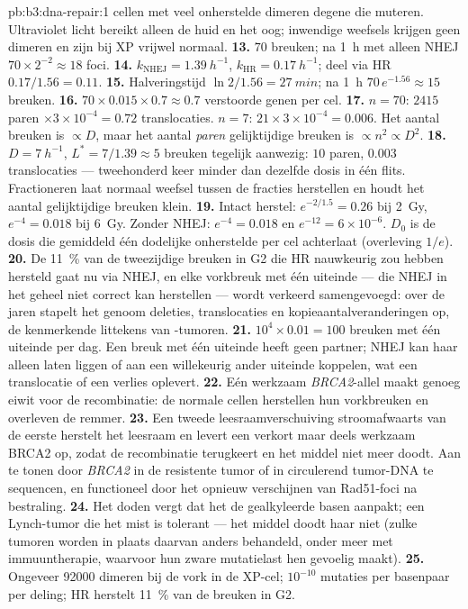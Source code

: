 \begin{solution}{pb:b3:dna-repair:1}
cellen met veel onherstelde dimeren degene die muteren. Ultraviolet
licht bereikt alleen de huid en het oog; inwendige weefsels krijgen
geen dimeren en zijn bij XP vrijwel normaal.
\textbf{13.} $70$ breuken; na \qty{1}{h} met alleen NHEJ $70\times
2^{-2} \approx 18$ foci.
\textbf{14.} $k_{\text{NHEJ}} = \qty{1.39}{h^{-1}}$, $k_{\text{HR}} =
\qty{0.17}{h^{-1}}$; deel via HR $0.17/1.56 = 0.11$.
\textbf{15.} Halveringstijd $\ln 2/1.56 = \qty{27}{min}$; na \qty{1}{h}
$70\,e^{-1.56} \approx 15$ breuken.
\textbf{16.} $70\times 0.015\times 0.7 \approx 0.7$ verstoorde genen per
cel.
\textbf{17.} $n = 70$: $2415$ paren $\times 3\times 10^{-4} = 0.72$
translocaties. $n = 7$: $21\times 3\times 10^{-4} = 0.006$. Het aantal
breuken is $\propto D$, maar het aantal \emph{paren} gelijktijdige
breuken is $\propto n^{2} \propto D^{2}$.
\textbf{18.} $D = \qty{7}{h^{-1}}$, $L^{*} = 7/1.39 \approx 5$ breuken
tegelijk aanwezig: $10$ paren, $0.003$ translocaties --- tweehonderd
keer minder dan dezelfde dosis in één flits. Fractioneren laat normaal
weefsel tussen de fracties herstellen en houdt het aantal gelijktijdige
breuken klein.
\textbf{19.} Intact herstel: $e^{-2/1.5} = 0.26$ bij \qty{2}{Gy},
$e^{-4} = 0.018$ bij \qty{6}{Gy}. Zonder NHEJ: $e^{-4} = 0.018$ en
$e^{-12} = 6\times 10^{-6}$. $D_{0}$ is de dosis die gemiddeld één
dodelijke onherstelde  per cel achterlaat (overleving $1/e$).
\textbf{20.} De \qty{11}{\%} van de tweezijdige breuken in G2 die HR
nauwkeurig zou hebben hersteld gaat nu via NHEJ, en elke vorkbreuk met
één uiteinde --- die NHEJ in het geheel niet correct kan herstellen ---
wordt verkeerd samengevoegd: over de jaren stapelt het genoom deleties,
translocaties en kopieaantalveranderingen op, de kenmerkende littekens
van \emph{}-tumoren.
\textbf{21.} $10^{4}\times 0.01 = 100$ breuken met één uiteinde per dag.
Een breuk met één uiteinde heeft geen partner; NHEJ kan haar alleen
laten liggen of aan een willekeurig ander uiteinde koppelen, wat een
translocatie of een verlies oplevert.
\textbf{22.} Eén werkzaam \emph{BRCA2}-allel maakt genoeg eiwit voor de
recombinatie: de normale cellen herstellen hun vorkbreuken en overleven
de remmer.
\textbf{23.} Een tweede leesraamverschuiving stroomafwaarts van de
eerste herstelt het leesraam en levert een verkort maar deels werkzaam
BRCA2 op, zodat de recombinatie terugkeert en het middel niet meer
doodt. Aan te tonen door \emph{BRCA2} in de resistente tumor of in
circulerend tumor-DNA te sequencen, en functioneel door het opnieuw
verschijnen van Rad51-foci na bestraling.
\textbf{24.} Het doden vergt dat het  de gealkyleerde
basen aanpakt; een Lynch-tumor die het mist is tolerant --- het middel
doodt haar niet (zulke tumoren worden in plaats daarvan anders
behandeld, onder meer met immuuntherapie, waarvoor hun zware mutatielast
hen gevoelig maakt).
\textbf{25.} Ongeveer \num{92000} dimeren bij de vork in de XP-cel;
$10^{-10}$ mutaties per basenpaar per deling; HR herstelt \qty{11}{\%}
van de breuken in G2.
\end{solution}
